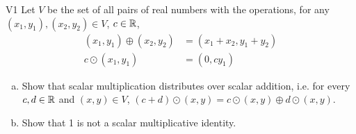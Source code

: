\begin{problem}{V1}
Let \(V\) be the set of all pairs of real numbers with the operations, for any \((x_1,y_1), (x_2,y_2) \in V\), \(c\in \mathbb{R}\),
\begin{align*}
(x_1,y_1) \oplus (x_2,y_2) &= (x_1+x_2,y_1+y_2) \\
c \odot (x_1,y_1) &= (0, cy_1)
\end{align*}
\begin{enumerate}[(a)]
\item Show that scalar multiplication
      distributes over scalar addition, i.e. for every \(c,d \in \mathbb{R}\) and \( (x,y) \in V\),
      \((c+d)\odot(x,y)=
      c\odot(x,y) \oplus d\odot(x,y)\).
\item Show that 1 is not a scalar multiplicative identity.
\end{enumerate}
\end{problem}


